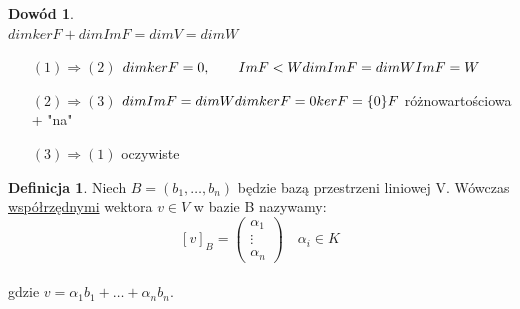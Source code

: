 \documentclass[12pt,a4paper]{article}
\theoremstyle{plain}
\theoremstyle{definition}
\theoremstyle{definition}
\newtheorem{df}{Definicja}[section]
\theoremstyle{definition}
\theoremstyle{definition}
\newtheorem*{dd}{Dowód}
\theoremstyle{definition}
\theoremstyle{definition}
\theoremstyle{definition}
\theoremstyle{definition}
\theoremstyle{definition}
\begin{document}
\begin{dd} 
    ~\\
    $dimker F + dimIm F = dim V = dim W$
    \begin{itemize}
        \item[$(1) \Rightarrow (2)$] $
            dimker F = 0, \qquad Im F < W \\
            dimIm F = dim W \\ 
            Im F = W$
        \item[$(2) \Rightarrow (3)$]
            $
            dimImF = dimW \\
            dimkerF = 0 \\ 
            kerF = \{0\} \\
            F
            $ różnowartościowa + "na"
        \item[$(3) \Rightarrow (1)$] oczywiste
    \end{itemize} 
\end{dd}

\begin{df} 
    Niech $B = (b_1,\dots,b_n) $ będzie bazą przestrzeni liniowej V. Wówczas \underline{współrzędnymi} wektora $v \in V$ w bazie B nazywamy: 
        $$ [v]_B = \begin{pmatrix} \alpha_1 \\ \vdots \\ \alpha_n \end{pmatrix} \quad \alpha_i \in K$$ \\
        gdzie $ v = \alpha_1 b_1 + \dots + \alpha_n b_n$.
\end{df}
\end{document}
